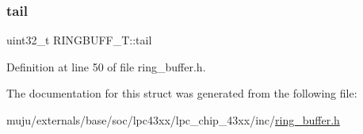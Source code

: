 \subsubsection{\texorpdfstring{tail}{tail}}
{\footnotesize\ttfamily uint32\+\_\+t R\+I\+N\+G\+B\+U\+F\+F\+\_\+\+T\+::tail}



Definition at line 50 of file ring\+\_\+buffer.\+h.



The documentation for this struct was generated from the following file\+:\begin{DoxyCompactItemize}
\item 
muju/externals/base/soc/lpc43xx/lpc\+\_\+chip\+\_\+43xx/inc/\hyperlink{ring__buffer_8h}{ring\+\_\+buffer.\+h}\end{DoxyCompactItemize}

